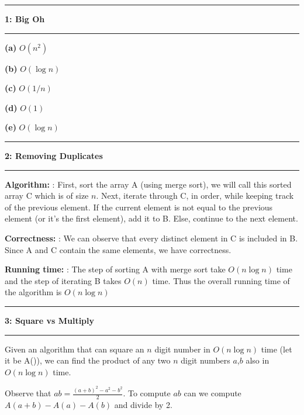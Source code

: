 \documentclass[11pt]{article}
\newcommand\question[2]{\vspace{.25in}\hrule\textbf{#1: #2}\vspace{.5em}\hrule\vspace{.10in}}
\renewcommand\part[1]{\vspace{.10in}\textbf{(#1)}}
\newcommand\algorithm{\vspace{.10in}\textbf{Algorithm: }}
\newcommand\correctness{\vspace{.10in}\textbf{Correctness: }}
\newcommand\runtime{\vspace{.10in}\textbf{Running time: }}
\begin{document}
\raggedright

\newcommand\NAME{Jake Pitkin}
\newcommand\UID{u0891770}
\newcommand\HWNUM{0}

\question{1}{Big Oh}
\part{a} $O(n^2)$

\part{b} $O(\log n)$

\part{c} $O(1/n)$

\part{d} $O(1)$

\part{e} $O(\log n)$

\question{2}{Removing Duplicates} 

\algorithm: First, sort the array A (using merge sort), we will call this sorted array C which is of size $n$.  Next, iterate through C, in order, while keeping track of the previous element. If the current element is not equal to the previous element (or it's the first element), add it to B. Else, continue to the next element.

\correctness: We can observe that every distinct element in C is included in B. Since A and C contain the same elements, we have correctness.

\runtime: The step of sorting A with merge sort take $O(n \log n)$ time and the step of iterating B takes $O(n)$ time. Thus the overall running time of the algorithm is $O(n \log n)$

\question{3}{Square vs Multiply}
Given an algorithm that can square an $n$ digit number in $O(n \log n)$ time (let it be A()), we can find the product of any two $n$ digit numbers $a$,$b$ also in $O(n \log n)$ time.

Observe that $ab = \frac{(a+b)^2 -a^2 - b^2}{2}$. To compute $ab$ can we compute $A(a+b) - A(a) - A(b)$ and divide by 2.
\end{document}

